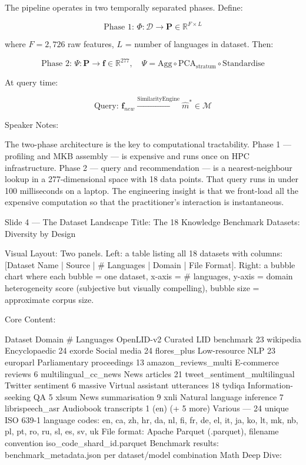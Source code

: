 The pipeline operates in two temporally separated phases. Define:

$$\text{Phase 1: } \Phi: \mathcal{D} \rightarrow \mathbf{P} \in \mathbb{R}^{F \times L}$$

where $F = 2{,}726$ raw features, $L$ = number of languages in dataset. Then:

$$\text{Phase 2: } \Psi: \mathbf{P} \rightarrow \mathbf{f} \in \mathbb{R}^{277}, \quad \Psi = \text{Agg} \circ \text{PCA}_{\text{stratum}} \circ \text{Standardise}$$

At query time:

$$\text{Query: } \mathbf{f}_{new} \xrightarrow{\text{SimilarityEngine}} \hat{m}^* \in \mathcal{M}$$

Speaker Notes:

The two-phase architecture is the key to computational tractability. Phase 1 — profiling and MKB assembly — is expensive and runs once on HPC infrastructure. Phase 2 — query and recommendation — is a nearest-neighbour lookup in a 277-dimensional space with 18 data points. That query runs in under 100 milliseconds on a laptop. The engineering insight is that we front-load all the expensive computation so that the practitioner's interaction is instantaneous.

Slide 4 — The Dataset Landscape
Title: The 18 Knowledge Benchmark Datasets: Diversity by Design

Visual Layout: Two panels. Left: a table listing all 18 datasets with columns: [Dataset Name | Source | # Languages | Domain | File Format]. Right: a bubble chart where each bubble = one dataset, x-axis = # languages, y-axis = domain heterogeneity score (subjective but visually compelling), bubble size = approximate corpus size.

Core Content:

Dataset	Domain	# Languages
OpenLID-v2	Curated LID benchmark	23
wikipedia	Encyclopaedic	24
exorde	Social media	24
flores_plus	Low-resource NLP	23
europarl	Parliamentary proceedings	13
amazon_reviews_multi	E-commerce reviews	6
multilingual_cc_news	News articles	21
tweet_sentiment_multilingual	Twitter sentiment	6
massive	Virtual assistant utterances	18
tydiqa	Information-seeking QA	5
xlsum	News summarisation	9
xnli	Natural language inference	7
librispeech_asr	Audiobook transcripts	1 (en)
(+ 5 more)	Various	—
24 unique ISO 639-1 language codes: en, ca, zh, hr, da, nl, fi, fr, de, el, it, ja, ko, lt, mk, nb, pl, pt, ro, ru, sl, es, sv, uk
File format: Apache Parquet (.parquet), filename convention {iso_code}_{shard_id}.parquet
Benchmark results: benchmark_metadata.json per dataset/model combination
Math Deep Dive:

